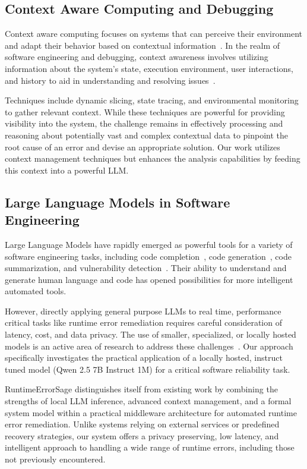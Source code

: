 \subsection{Context Aware Computing and Debugging}
Context aware computing focuses on systems that can perceive their environment and adapt their behavior based on contextual information~\cite{context_aware_computing_survey_2009}. In the realm of software engineering and debugging, context awareness involves utilizing information about the system's state, execution environment, user interactions, and history to aid in understanding and resolving issues~\cite{context-aware-debugging-2023}.

Techniques include dynamic slicing, state tracing, and environmental monitoring to gather relevant context. While these techniques are powerful for providing visibility into the system, the challenge remains in effectively processing and reasoning about potentially vast and complex contextual data to pinpoint the root cause of an error and devise an appropriate solution. Our work utilizes context management techniques but enhances the analysis capabilities by feeding this context into a powerful LLM.

\subsection{Large Language Models in Software Engineering}
Large Language Models have rapidly emerged as powerful tools for a variety of software engineering tasks, including code completion~\cite{copilot2021}, code generation~\cite{llm_code_generation_2022}, code summarization, and vulnerability detection~\cite{llm_security_applications_2023}. Their ability to understand and generate human language and code has opened possibilities for more intelligent automated tools.

However, directly applying general purpose LLMs to real time, performance critical tasks like runtime error remediation requires careful consideration of latency, cost, and data privacy. The use of smaller, specialized, or locally hosted models is an active area of research to address these challenges~\cite{local_llm_deployment_2023, edge_llm_inference_2022}. Our approach specifically investigates the practical application of a locally hosted, instruct tuned model (Qwen 2.5 7B Instruct 1M) for a critical software reliability task.

RuntimeErrorSage distinguishes itself from existing work by combining the strengths of local LLM inference, advanced context management, and a formal system model within a practical middleware architecture for automated runtime error remediation. Unlike systems relying on external services or predefined recovery strategies, our system offers a privacy preserving, low latency, and intelligent approach to handling a wide range of runtime errors, including those not previously encountered.